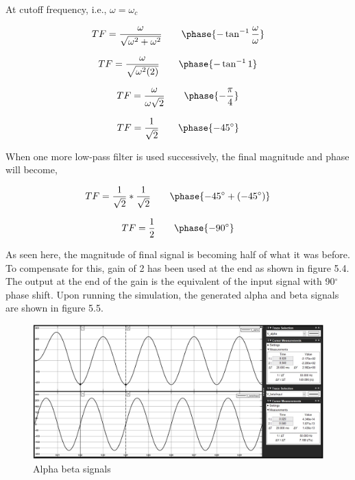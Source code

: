\documentclass[a4paper,12pt]{iitmdiss}
\begin{document}
At cutoff frequency, i.e., $\omega = \omega_c$


 \begin{equation}
      TF = \frac{\omega}{\sqrt{\omega^2 + \omega^2}} \quad \quad \phase{ - \tan^{-1}{\frac{\omega}{\omega}}}
  \end{equation}

\begin{equation}
      TF = \frac{\omega}{\sqrt{\omega^2(2)}} \quad \quad \phase{ - \tan^{-1}{1}}
  \end{equation}
  
  \begin{equation}
      TF = \frac{\omega}{\omega \sqrt{2}} \quad \quad \phase{ - \frac{\pi}{4}}
  \end{equation}

\begin{equation}
      TF = \frac{1}{\sqrt{2}} \quad \quad \phase{ - 45^{\circ}}
  \end{equation}

When one more low-pass filter is used successively, the final magnitude and phase will become,

\begin{equation}
      TF = \frac{1}{\sqrt{2}} * \frac{1}{\sqrt{2}} \quad \quad \phase{ - 45^{\circ} + (-45^{\circ})}
  \end{equation}

\begin{equation}
      TF = \frac{1}{2} \quad \quad \phase{- 90^{\circ}}
  \end{equation}

As seen here, the magnitude of final signal is becoming half of what it was before. To compensate for this, gain of 2 has been used at the end as shown in figure 5.4. The output at the end of the gain is the equivalent of the input signal with 90$^{\circ}$ phase shift. Upon running the simulation, the generated alpha and beta signals are shown in figure 5.5.   

\begin{figure}[hbt!]
    \centering
    \includegraphics[width=1.0\textwidth]{AlphaBeta_one signal.jpg}
    \caption{Alpha beta signals}
\end{figure}
\end{document}
